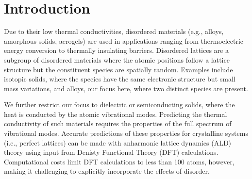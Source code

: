 \documentclass[aps,prb,onecolumn,preprint,footinbib,superscriptaddress,amsmath,amssymb,floatfix]{revtex4}
\begin{document}
\section{\label{S:Introduction}Introduction}

Due to their low thermal conductivities, 
disordered materials (e.g., alloys, amorphous solids, aerogels) 
are used in 
applications ranging from thermoelectric energy conversion to 
thermally insulating barriers.
\cite{cahill_lattice_1988,minnich_bulk_2009,chen_recent_2003,
snyder_complex_2008,toberer_phonon_2011,zebarjadi_perspectives_2012} 
Disordered lattices are a subgroup of disordered materials where 
the atomic positions follow a lattice structure but the 
constituent species are spatially random. Examples include isotopic 
solids, where the species have the same electronic structure but 
small mass variations,\cite{tamura_isotope_1983,lindsay_thermal_2012} 
and alloys, our focus here, where two distinct 
species are present.\cite{abeles_thermal_1962,abeles_lattice_1963}

We further restrict our focus to dielectric or semiconducting solids,  
where the heat is conducted by the atomic vibrational modes. 
Predicting the thermal conductivity of such materials 
requires the properties of the full spectrum of vibrational modes.
\cite{ziman_electrons_2001,feldman_thermal_1993,allen_diffusons_1999} 
Accurate predictions of these properties for 
crystalline systems (i.e., perfect lattices)  
can be made with anharmonic lattice dynamics (ALD) theory 
using input from Denisty Functional Theory (DFT)  
calculations.\cite{ward_intrinsic_2010,lindsay_thermal_2012,
garg_role_2011,
shiga_microscopic_2012,tian_phonon_2012,
shiomi_thermal_2011,esfarjani_heat_2011,
li_thermal_2012,luckyanova_coherent_2012}
Computational costs limit DFT calculations to less than 100 atoms, 
however, making it challenging to explicitly incorporate the effects 
of disorder.
\cite{koker_thermal_2009,bao_first-principles_2012,sosso_thermal_2012,
lindsay_thermal_2012,tian_phonon_2012,garg_role_2011}
\end{document}
